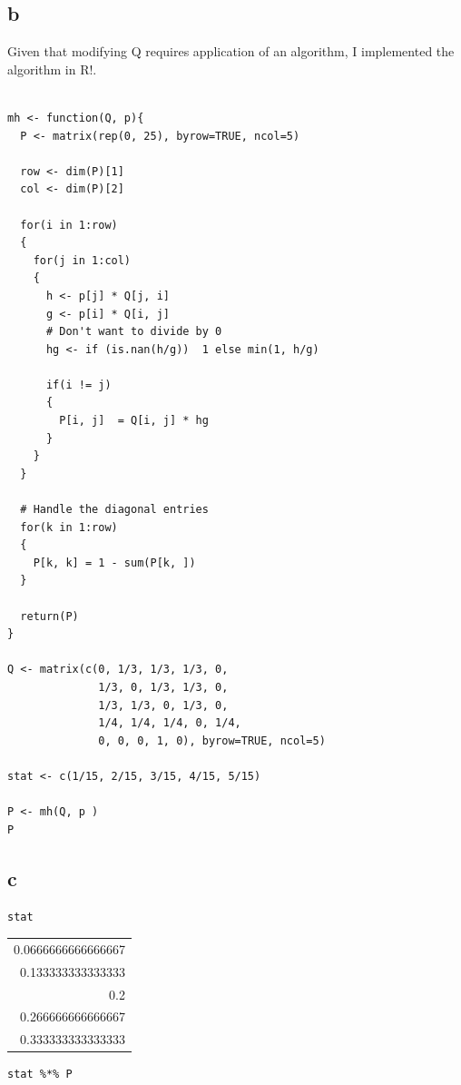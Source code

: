 \documentclass[11pt]{article}
\begin{document}
\subsection*{b}
\label{sec:org4a79366}
Given that modifying Q requires application of an algorithm, I implemented the algorithm in R!.
\begin{verbatim}

mh <- function(Q, p){
  P <- matrix(rep(0, 25), byrow=TRUE, ncol=5)

  row <- dim(P)[1]
  col <- dim(P)[2]

  for(i in 1:row)
  {
    for(j in 1:col)
    {
      h <- p[j] * Q[j, i]
      g <- p[i] * Q[i, j]
      # Don't want to divide by 0
      hg <- if (is.nan(h/g))  1 else min(1, h/g)

      if(i != j)
      {
        P[i, j]  = Q[i, j] * hg
      }
    }
  }

  # Handle the diagonal entries
  for(k in 1:row)
  {
    P[k, k] = 1 - sum(P[k, ])
  }

  return(P)
}

Q <- matrix(c(0, 1/3, 1/3, 1/3, 0,
              1/3, 0, 1/3, 1/3, 0,
              1/3, 1/3, 0, 1/3, 0,
              1/4, 1/4, 1/4, 0, 1/4,
              0, 0, 0, 1, 0), byrow=TRUE, ncol=5)

stat <- c(1/15, 2/15, 3/15, 4/15, 5/15)

P <- mh(Q, p )
P
\end{verbatim}

\subsection*{c}
\label{sec:org77c313b}
\begin{verbatim}
stat
\end{verbatim}

\begin{center}
\begin{tabular}{r}
0.0666666666666667\\
0.133333333333333\\
0.2\\
0.266666666666667\\
0.333333333333333\\
\end{tabular}
\end{center}

\begin{verbatim}
stat %*% P
\end{verbatim}
\end{document}
